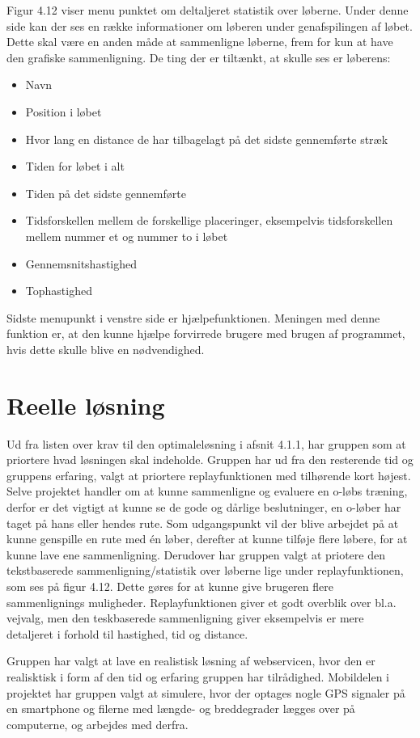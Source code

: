 Figur 4.12 viser menu punktet om deltaljeret statistik over løberne. Under denne side kan der ses en række informationer om løberen under genafspilingen af løbet. Dette skal være en anden måde at sammenligne løberne, frem for kun at have den grafiske sammenligning. De ting der er tiltænkt, at skulle ses er løberens:
\begin{itemize}
\item Navn
\item Position i løbet
\item Hvor lang en distance de har tilbagelagt på det sidste gennemførte stræk
\item Tiden for løbet i alt
\item Tiden på det sidste gennemførte
\item Tidsforskellen mellem de forskellige placeringer, eksempelvis tidsforskellen mellem nummer et og nummer to i løbet
\item Gennemsnitshastighed
\item Tophastighed
\end{itemize}

Sidste menupunkt i venstre side er hjælpefunktionen. Meningen med denne funktion er, at den kunne hjælpe forvirrede brugere med brugen af programmet, hvis dette skulle blive en nødvendighed.

\section{Reelle løsning}
Ud fra listen over krav til den optimaleløsning i afsnit 4.1.1, har gruppen som at priortere hvad løsningen skal indeholde. Gruppen har ud fra den resterende tid og gruppens erfaring, valgt at priortere replayfunktionen med tilhørende kort højest. Selve projektet handler om at kunne sammenligne og evaluere en o-løbs træning, derfor er det vigtigt at kunne se de gode og dårlige beslutninger, en o-løber har taget på hans eller hendes rute. Som udgangspunkt vil der blive arbejdet på at kunne genspille en rute med én løber, derefter at kunne tilføje flere løbere, for at kunne lave ene sammenligning. Derudover har gruppen valgt at priotere den tekstbaserede sammenligning/statistik over løberne lige under replayfunktionen, som ses på figur 4.12. Dette gøres for at kunne give brugeren flere sammenlignings muligheder. Replayfunktionen giver et godt overblik over bl.a. vejvalg, men den teskbaserede sammenligning giver eksempelvis er mere detaljeret i forhold til hastighed, tid og distance.

Gruppen har valgt at lave en realistisk løsning af webservicen, hvor den er realisktisk i form af den tid og erfaring gruppen har tilrådighed. Mobildelen i projektet har gruppen valgt at simulere, hvor der optages nogle GPS signaler på en smartphone og filerne med længde- og breddegrader lægges over på computerne, og arbejdes med derfra.


